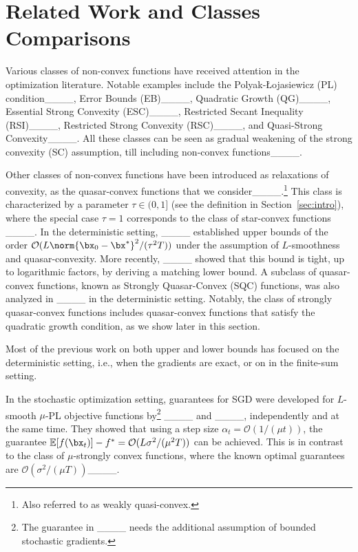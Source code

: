 \section{Related Work and Classes Comparisons}
\label{sec:comparisons}
	Various classes of non-convex functions have received attention in the optimization literature. Notable examples include the Polyak-Łojasiewicz (PL) condition____, Error Bounds (EB)____, Quadratic Growth (QG)____, Essential Strong Convexity (ESC)____, Restricted Secant Inequality (RSI)____, Restricted Strong Convexity (RSC)____, and Quasi-Strong Convexity____. All these classes can be seen as gradual weakening of the strong convexity (SC) assumption, till including non-convex functions____.
	
	Other classes of non-convex functions have been introduced as relaxations of convexity, as the quasar-convex functions that we consider____.\footnote{Also referred to as weakly quasi-convex.}
	This class is characterized by a parameter $\tau \in (0,1]$ (see the definition in Section~\ref{sec:intro}), where the special case $\tau = 1$ corresponds to the class of star-convex functions ____. 	In the deterministic setting, ____ established upper bounds of the order $\mathcal{O}(L\norm{\bx_0 - \bx^*}^2/(\tau^2 T))$ under the assumption of $L$-smoothness and quasar-convexity. More recently, ____ showed that this bound is tight, up to logarithmic factors, by deriving a matching lower bound.    
	A subclass of quasar-convex functions, known as Strongly Quasar-Convex (SQC) functions, was also analyzed in ____ in the deterministic setting. 
	Notably, the class of strongly quasar-convex functions includes quasar-convex functions that satisfy the quadratic growth condition, as we show later in this section.
	
	Most of the previous work on both upper and lower bounds has focused on the deterministic setting, i.e., when the gradients are exact, or on in the finite-sum setting.
		
	In the stochastic optimization setting,   guarantees for SGD were developed for $L$-smooth $\mu$-PL objective functions by\footnote{The guarantee in ____ needs the additional assumption of bounded stochastic gradients.} ____ and ____, independently and at the same time. They showed that using a step size $\alpha_t = \mathcal{O}(1/(\mu t))$, the guarantee $\mathbb{E}[f(\bx_t)] - f^* = \mathcal{O}(L\sigma^2/(\mu^2 T))$ can be achieved. This is in contrast to the class of $\mu$-strongly convex functions, where the known optimal guarantees are $\mathcal{O}(\sigma^2/(\mu T))$____. 
	
